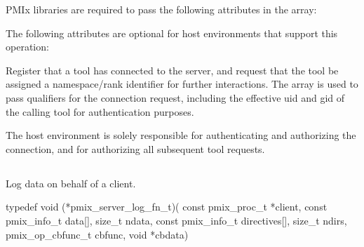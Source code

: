 \begin{arglist}
\end{arglist}

\reqattrstart
\ac{PMIx} libraries are required to pass the following attributes in the  array:


\reqattrend


\optattrstart
The following attributes are optional for host environments that support this operation:


\optattrend

\descr

Register that a tool has connected to the server, and request that the tool be assigned a namespace/rank identifier for further interactions.
The  array is used to pass qualifiers for the connection request, including the effective uid and gid of the calling tool for authentication purposes.

\advicermstart
The host environment is solely responsible for authenticating and authorizing the connection, and for authorizing all subsequent tool requests.
\advicermend


\subsection{}

\summary

Log data on behalf of a client.

\format

\cspecificstart
\begin{codepar}
typedef void (*pmix_server_log_fn_t)(
                             const pmix_proc_t *client,
                             const pmix_info_t data[], size_t ndata,
                             const pmix_info_t directives[], size_t ndirs,
                             pmix_op_cbfunc_t cbfunc, void *cbdata)
\end{codepar}
\cspecificend


